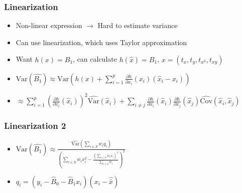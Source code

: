 \documentclass{beamer}
\begin{document}
\begin{frame}
  \frametitle{Linearization}

  \begin{itemize}
  \addtolength{\itemsep}{0.5\baselineskip}

\item Non-linear expression \(\rightarrow\) Hard to estimate variance %
  \item Can use linearization, which uses Taylor approximation %
  \item Want \(h(x) = B_1\), can calculate \(h(\hat{x}) = \hat{B_1}\), \(x =
    (t_x, t_y, t_{x^2}, t_{xy})\)
  \item \(\mathrm{Var} \left( \hat{B_1} \right)
  \approx \mathrm{Var} \left( h(x) + \sum_{i = 1}^p \frac{\partial h}{\partial x_i} (x_i) \left( \hat{x}_i - x_i
    \right) \right) \)
  \item \(\approx \sum_{i = 1}^p \left( \frac{\partial h}{\partial x_i}
      (\hat{x}_i)  \right)^2 \widehat{\mathrm{Var}} \left( \hat{x}_i \right) +
    \sum_{i \neq j}  \frac{\partial h}{\partial x_i} (\hat{x}_i)  \frac{\partial
      h}{\partial x_j} (\hat{x}_j) \widehat{\mathrm{Cov}} \left( \hat{x}_i,
      \hat{x}_j \right)\) %
  \end{itemize}

\end{frame}

\begin{frame}
 \frametitle{Linearization 2}

 \begin{itemize}
 \item \(\mathrm{Var}(\hat{B_1}) \approx \frac{\widehat{\mathrm{Var}}\left( \sum_{i \in S} w_i q_i \right)}
   {\left( \sum_{i \in S} w_i x_i^2 - \frac{\left( \sum_{i \in S} w_i x_i \right)^2}{\sum_{i \in S} w_i} \right)^2}\)
 \item \(q_i = (y_i - \hat{B}_0 - \hat{B}_1 x_i)(x_i - \hat{\bar{x}})\) %
 
 \end{itemize}
  
\end{frame}
\end{document}
